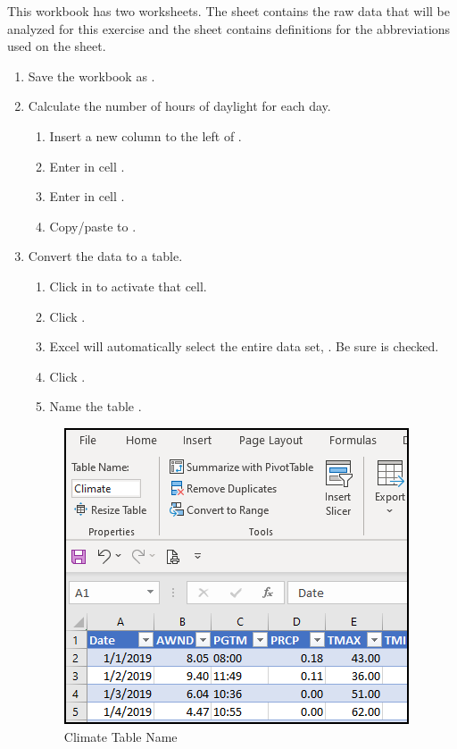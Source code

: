 This workbook has two worksheets. The  sheet contains the raw data that will be analyzed for this exercise and the  sheet contains definitions for the abbreviations used on the  sheet.

\begin{enumerate}[resume]
	\item Save the workbook as .
	\item Calculate the number of hours of daylight for each day.
	
	\begin{enumerate}
		\item Insert a new column to the left of .
		\item Enter  in cell .
		\item Enter  in cell .
		\item Copy/paste  to .
	\end{enumerate}
	
	\item Convert the data to a table.
	
	\begin{enumerate}
		\item Click in  to activate that cell.
		\item Click .
		\item Excel will automatically select the entire data set, . Be sure  is checked.
		\item Click .
		\item Name the table .
	\end{enumerate}
	
	\begin{figure}[H]
		\centering
		\includegraphics[width=\maxwidth{.95\linewidth}]{gfx/ch09_fig85}
		\caption{Climate Table Name}
		\label{09:fig85}
	\end{figure}
	

\end{enumerate}
